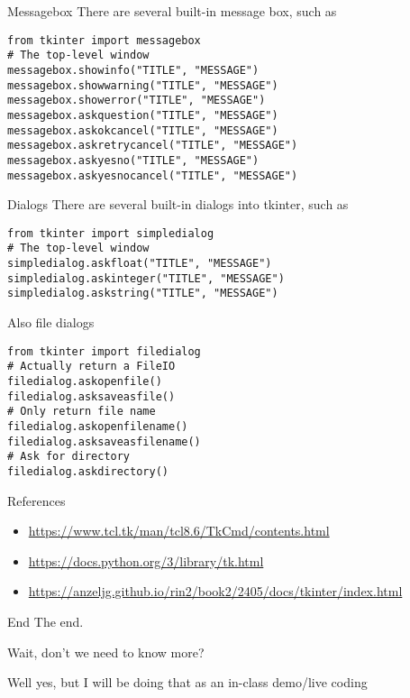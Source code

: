 \begin{frame}[containsverbatim]{Messagebox}
There are several built-in message box, such as
  \begin{verbatim}
from tkinter import messagebox
# The top-level window
messagebox.showinfo("TITLE", "MESSAGE")
messagebox.showwarning("TITLE", "MESSAGE")
messagebox.showerror("TITLE", "MESSAGE")
messagebox.askquestion("TITLE", "MESSAGE")
messagebox.askokcancel("TITLE", "MESSAGE")
messagebox.askretrycancel("TITLE", "MESSAGE")
messagebox.askyesno("TITLE", "MESSAGE")
messagebox.askyesnocancel("TITLE", "MESSAGE")
  \end{verbatim}
\end{frame}

\begin{frame}[containsverbatim]{Dialogs}
There are several built-in dialogs into tkinter, such as
  \begin{verbatim}
from tkinter import simpledialog
# The top-level window
simpledialog.askfloat("TITLE", "MESSAGE")
simpledialog.askinteger("TITLE", "MESSAGE")
simpledialog.askstring("TITLE", "MESSAGE")
  \end{verbatim}
  Also file dialogs
  \begin{verbatim}
from tkinter import filedialog
# Actually return a FileIO
filedialog.askopenfile()
filedialog.asksaveasfile()
# Only return file name
filedialog.askopenfilename()
filedialog.asksaveasfilename()
# Ask for directory
filedialog.askdirectory()
  \end{verbatim}
\end{frame}

\begin{frame}{References}
\begin{itemize}
  \item \url{https://www.tcl.tk/man/tcl8.6/TkCmd/contents.html}
  \item \url{https://docs.python.org/3/library/tk.html}
  \item \url{https://anzeljg.github.io/rin2/book2/2405/docs/tkinter/index.html}
\end{itemize}
\end{frame}

\begin{frame}[standout]{End}
  The end. \pause

  Wait, don't we need to know more?\pause

  Well yes, but I will be doing that as an in-class demo/live coding
\end{frame}


